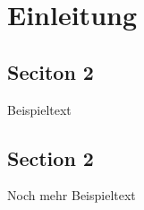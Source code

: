 \chapter{Einleitung}

\section{Seciton 2}

Beispieltext

\section{Section 2}

Noch mehr Beispieltext